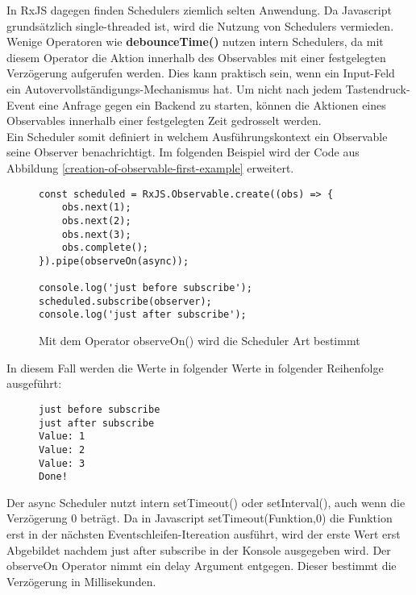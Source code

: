 \noindent
In RxJS dagegen finden Schedulers ziemlich selten Anwendung. Da Javascript grundsätzlich single-threaded ist, wird die Nutzung von Schedulers vermieden. Wenige Operatoren wie \textbf{debounceTime()} nutzen intern Schedulers, da mit diesem Operator die Aktion innerhalb des Observables mit einer festgelegten Verzögerung aufgerufen werden. Dies kann praktisch sein, wenn ein Input-Feld ein Autovervollständigungs-Mechanismus hat. Um nicht nach jedem Tastendruck-Event eine Anfrage gegen ein Backend zu starten, können die Aktionen eines Observables innerhalb einer festgelegten Zeit gedrosselt werden.\\

\noindent
Ein Scheduler somit definiert in welchem Ausführungskontext ein Observable seine Observer benachrichtigt. Im folgenden Beispiel wird der Code aus Abbildung \ref{creation-of-observable-first-example} erweitert.

\begin{figure}[H]
\begin{lstlisting}[basicstyle=\small]
const scheduled = RxJS.Observable.create((obs) => {
    obs.next(1);
    obs.next(2);
    obs.next(3);
    obs.complete();
}).pipe(observeOn(async));

console.log('just before subscribe');
scheduled.subscribe(observer);
console.log('just after subscribe');
\end{lstlisting}
\caption{Mit dem Operator observeOn() wird die Scheduler Art bestimmt}
\end{figure}

\noindent
In diesem Fall werden die Werte in folgender Werte in folgender Reihenfolge ausgeführt:

\begin{figure}[H]
\begin{lstlisting}
just before subscribe
just after subscribe
Value: 1
Value: 2
Value: 3
Done!
\end{lstlisting}
\end{figure}

\noindent
Der async Scheduler nutzt intern setTimeout() oder setInterval(), auch wenn die Verzögerung 0 beträgt. Da in Javascript setTimeout(Funktion,0) die Funktion erst in der nächsten Eventschleifen-Itereation ausführt, wird der erste Wert erst Abgebildet nachdem \glqq just after subscribe\grqq{} in der Konsole ausgegeben wird. Der observeOn Operator nimmt ein delay Argument entgegen. Dieser bestimmt die Verzögerung in Millisekunden.



